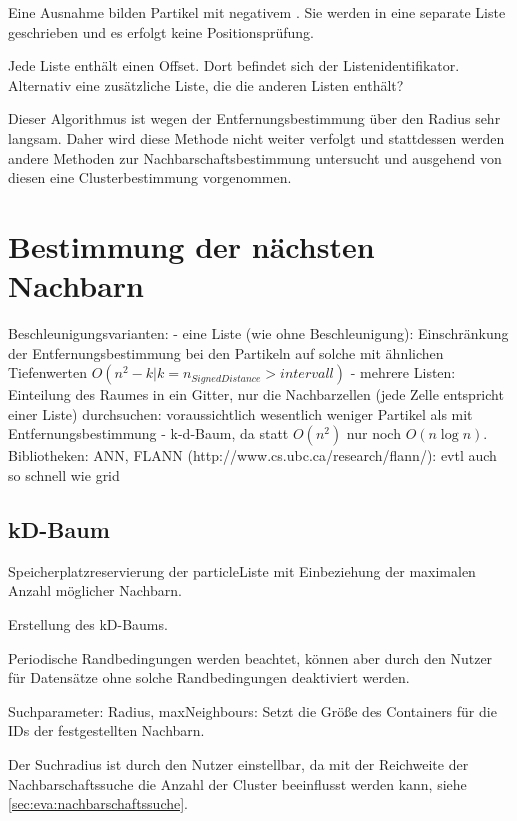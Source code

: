 Eine Ausnahme bilden Partikel mit negativem . Sie werden in eine separate Liste geschrieben und es erfolgt keine Positionsprüfung.

Jede Liste enthält einen Offset. Dort befindet sich der Listenidentifikator. Alternativ eine zusätzliche Liste, die die anderen Listen enthält?

Dieser Algorithmus ist wegen der Entfernungsbestimmung über den Radius sehr langsam. Daher wird diese Methode nicht weiter verfolgt und stattdessen werden andere Methoden zur Nachbarschaftsbestimmung untersucht und ausgehend von diesen eine Clusterbestimmung vorgenommen.

\section{Bestimmung der nächsten Nachbarn}\label{sec:nachbarschaftssuche}


Beschleunigungsvarianten:
- eine Liste (wie ohne Beschleunigung): Einschränkung der Entfernungsbestimmung bei den Partikeln auf solche mit ähnlichen Tiefenwerten $O(n^2 - k | k = n_{SignedDistance} > intervall)$
- mehrere Listen: Einteilung des Raumes in ein Gitter, nur die Nachbarzellen (jede Zelle entspricht einer Liste) durchsuchen: voraussichtlich wesentlich weniger Partikel als mit Entfernungsbestimmung
- k-d-Baum, da statt $O(n^2)$ nur noch $O(n \log n)$. Bibliotheken: ANN, FLANN (http://www.cs.ubc.ca/research/flann/): evtl auch so schnell wie grid

\subsection{kD-Baum}

Speicherplatzreservierung der particleListe mit Einbeziehung der maximalen Anzahl möglicher Nachbarn.

Erstellung des kD-Baums.

Periodische Randbedingungen werden beachtet, können aber durch den Nutzer für Datensätze ohne solche Randbedingungen deaktiviert werden.

Suchparameter: Radius, maxNeighbours: Setzt die Größe des Containers für die IDs der festgestellten Nachbarn.

Der Suchradius ist durch den Nutzer einstellbar, da mit der Reichweite der Nachbarschaftssuche die Anzahl der Cluster beeinflusst werden kann, siehe \autoref{sec:eva:nachbarschaftssuche}.


